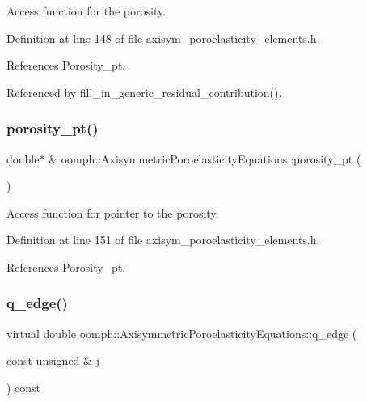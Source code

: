 Access function for the porosity. 



Definition at line 148 of file axisym\+\_\+poroelasticity\+\_\+elements.\+h.



References Porosity\+\_\+pt.



Referenced by fill\+\_\+in\+\_\+generic\+\_\+residual\+\_\+contribution().

\mbox{\label{classoomph_1_1AxisymmetricPoroelasticityEquations_a9ab90bff58911ea7f41e09d73ed8a60b}} 
\subsubsection{\texorpdfstring{porosity\+\_\+pt()}{porosity\_pt()}}
{\footnotesize\ttfamily double$\ast$ \& oomph\+::\+Axisymmetric\+Poroelasticity\+Equations\+::porosity\+\_\+pt (\begin{DoxyParamCaption}{ }\end{DoxyParamCaption})\hspace{0.3cm}{\ttfamily [inline]}}



Access function for pointer to the porosity. 



Definition at line 151 of file axisym\+\_\+poroelasticity\+\_\+elements.\+h.



References Porosity\+\_\+pt.

\mbox{\label{classoomph_1_1AxisymmetricPoroelasticityEquations_adf0d3ac9623d62b353e44e82984cf01f}} 
\subsubsection{\texorpdfstring{q\+\_\+edge()}{q\_edge()}\hspace{0.1cm}{\footnotesize\ttfamily [1/2]}}
{\footnotesize\ttfamily virtual double oomph\+::\+Axisymmetric\+Poroelasticity\+Equations\+::q\+\_\+edge (\begin{DoxyParamCaption}\item[{const unsigned \&}]{j }\end{DoxyParamCaption}) const\hspace{0.3cm}{\ttfamily [pure virtual]}}



